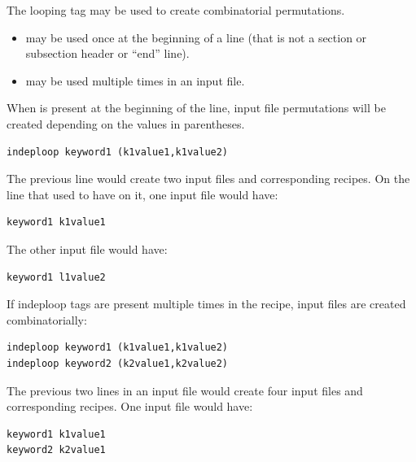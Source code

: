 \documentclass[letterpaper,10pt,english]{sphinxmanual}
\begin{document}
The looping tag  may be used to create combinatorial permutations.
\begin{itemize}
\item {} 
 may be used once at the beginning of a line (that is not a section or subsection header or ``end'' line).

\item {} 
 may be used multiple times in an input file.

\end{itemize}

When  is present at the beginning of the line, input file permutations will be created depending on the values in parentheses.

\begin{Verbatim}[commandchars=\\\{\}]
indeploop keyword1 (k1value1,k1value2)
\end{Verbatim}

The previous line would create two input files and corresponding recipes.
On the line that used to have  on it, one input file would have:

\begin{Verbatim}[commandchars=\\\{\}]
keyword1 k1value1
\end{Verbatim}

The other input file would have:

\begin{Verbatim}[commandchars=\\\{\}]
keyword1 l1value2
\end{Verbatim}

If indeploop tags are present multiple times in the recipe, input files are created combinatorially:

\begin{Verbatim}[commandchars=\\\{\}]
indeploop keyword1 (k1value1,k1value2)
indeploop keyword2 (k2value1,k2value2)
\end{Verbatim}

The previous two lines in an input file would create four input files and corresponding recipes.
One input file would have:

\begin{Verbatim}[commandchars=\\\{\}]
keyword1 k1value1
keyword2 k2value1
\end{Verbatim}
\end{document}
